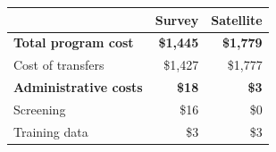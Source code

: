 \begin{tabular}{lrr}
\toprule
 & \textbf{Survey} & \textbf{Satellite} \\
\midrule
\textbf{Total program cost} & \textbf{\$1,445} & \textbf{\$1,779} \\
\quad Cost of transfers & \$1,427 & \$1,777 \\
\quad \textbf{Administrative costs} & \textbf{\$18} & \textbf{\$3} \\
\qquad Screening & \$16 & \$0 \\
\qquad Training data & \$3 & \$3 \\
\bottomrule
\end{tabular}
